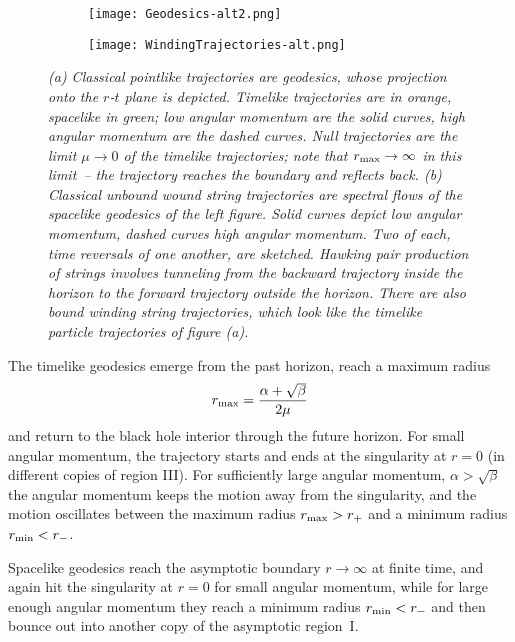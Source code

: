 \documentclass[11pt]{article}
\def\be{\begin{equation}}
\def\ee{\end{equation}}
\numberwithin{equation}{section}
\begin{document}
\begin{figure}[ht]
%
\centering
  \begin{subfigure}[b]{0.3\textwidth}
  \hskip 0cm
    \texttt{[image: Geodesics-alt2.png]}
    \caption{ }
    \label{fig:geodesics}
  \end{subfigure}
% 
\qquad\qquad\qquad
  \begin{subfigure}[b]{0.3\textwidth}
      \hskip 0cm
    \texttt{[image: WindingTrajectories-alt.png]}
    \caption{ }
    \label{fig:windingtrajectories}
  \end{subfigure}
%
\caption{\it 
(a) Classical pointlike trajectories are geodesics, whose projection onto the $r$-$t$ plane is depicted.  Timelike trajectories are in orange, spacelike in green; low angular momentum are the solid curves, high angular momentum are the dashed curves.  Null trajectories are the limit $\mu\to 0$ of the timelike trajectories; note that $r_{\rm max}\to\infty$ in this limit~-- the trajectory reaches the boundary and reflects back.
(b) Classical unbound wound string trajectories are spectral flows of the spacelike geodesics of the left figure.  Solid curves depict low angular momentum, dashed curves high angular momentum.  Two of each, time reversals of one another, are sketched.  Hawking pair production of strings involves tunneling from the backward trajectory inside the horizon to the forward trajectory outside the horizon.  There are also bound winding string trajectories, which look like the timelike particle trajectories of figure (a).
}
\label{fig:Ellipses}
\end{figure}

The timelike geodesics emerge from the past horizon, reach a maximum radius
\be
r_{\rm max} = \frac{\alpha+\sqrt{\beta}}{2\mu}
\ee
and return to the black hole interior through the future horizon.  For small angular momentum, the trajectory starts and ends at the singularity at $r=0$ (in different copies of region III).  For sufficiently large angular momentum, $\alpha>\sqrt{\beta}$ the angular momentum keeps the motion away from the singularity, and the motion oscillates between the maximum radius $r_{\rm max}>r_+$ and a minimum radius $r_{\rm min}<r_-$.

Spacelike geodesics reach the asymptotic boundary $r\to\infty$ at finite time, and again hit the singularity at $r=0$ for small angular momentum, while for large enough angular momentum they reach a minimum radius $r_{\rm min}<r_-$ and then bounce out into another copy of the asymptotic region~I.
\end{document}
